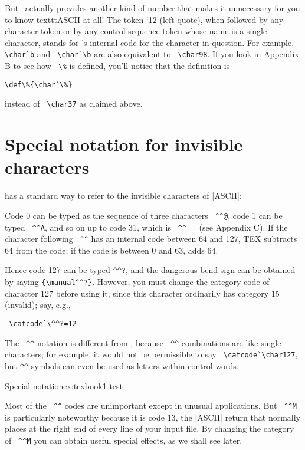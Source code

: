 But \tex\ actually provides another kind of number that makes it unnecessary
for you to know texttt{ASCII} at all! The token `12 (left quote), when followed by
any character token or by any control sequence token whose name is a single character,
stands for \tex's internal code for the character in question. For example, \verb+\char`b+ and
\verb+ \char`\b+ are also equivalent to \verb+ \char98+. If you look in Appendix B to see how \verb+ \%+ is
defined, you'll notice that the definition is

\verb+\def\%{\char`\%}+

instead of \verb+ \char37+  as claimed above.

\section{Special notation for invisible characters}

\tex has a standard way to refer to the invisible characters of |ASCII|: 

Code 0 can be typed as the sequence of three characters \verb+ ^^@+, code 1 can be typed
\verb+ ^^A+, and so on up to code 31, which is \verb+ ^^_  +(see Appendix C). If the character following
\verb+ ^^+ has an internal code between 64 and 127, TEX subtracts 64 from the code; if the
code is between 0 and 63, \tex adds 64. 

Hence code 127 can be typed \verb+^^?+, and
the dangerous bend sign can be obtained by saying \verb+{\manual^^?}+. However, you must
change the category code of character 127 before using it, since this character ordinarily
has category 15 (invalid); say, e.g., 

\verb+ \catcode`\^^?=12 +

The \verb+ ^^+ notation is different from
\cmd{\char}, because \verb+ ^^+ combinations are like single characters; for example, it would not
be permissible to say \verb+ \catcode`\char127+, but \verb+^^+ symbols can even be used as letters within control words.

\begin{texexample}{Special notation}{ex:texbook1}
\def\^^zz{test}
\^^zz
\end{texexample}


Most of the \verb+ ^^+ codes are unimportant except in unusual applications. But
\verb+ ^^M+ is particularly noteworthy because it is code 13, the |ASCII| return that
\tex normally places at the right end of every line of your input file. By changing the
category of \verb+ ^^M+  you can obtain useful special effects, as we shall see later.

